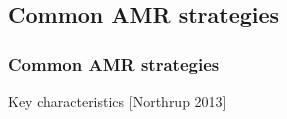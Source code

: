 \documentclass{beamer}
\begin{document}

\subsection[AMR types]{Common AMR strategies}
\begin{frame}%
\frametitle{Common AMR strategies}
\tiny
\begin{minipage}[t][1\textheight]{1\textwidth}
\vspace{-15pt}
\begin{exampleblock}{Key characteristics}
[Northrup 2013]
\vspace{-20pt}
\begin{figure} \label{fig:AMRtypes}
\centering
{}

\end{figure}
\end{exampleblock}
\end{minipage}
\end{frame}
\end{document}
